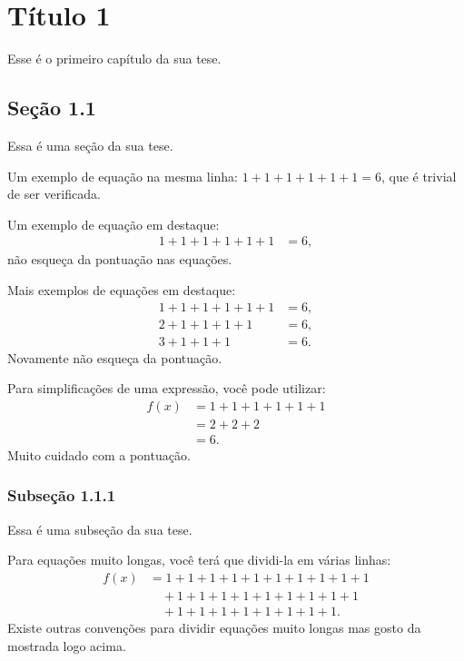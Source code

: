 \chapter{T\'itulo 1}
Esse \'e o primeiro cap\'itulo da sua tese.

\section{Se\c c\~ao 1.1}
Essa \'{e} uma se\c{c}\~{a}o da sua tese.

Um exemplo de equa\c{c}\~{a}o na mesma linha: 
$ 1 + 1 + 1 + 1 + 1 + 1 = 6$, 
que \'{e} trivial de ser verificada.

Um exemplo de equa\c{c}\~{a}o em destaque:
\begin{align*}
1 + 1 + 1 + 1 + 1 + 1 &= 6,
\end{align*}
n\~{a}o esque\c{c}a da pontua\c{c}\~{a}o nas equa\c{c}\~{o}es.

Mais exemplos de equa\c{c}\~{o}es em destaque:
\begin{align*}
1 + 1 + 1 + 1 + 1 + 1 &= 6, \\
2 + 1 + 1 + 1 + 1 &= 6, \\
3 + 1 + 1 + 1 &= 6.
\end{align*}
Novamente n\~{a}o esque\c{c}a da pontua\c{c}\~{a}o.

Para simplifica\c{c}\~{o}es de uma express\~{a}o, voc\^{e} pode utilizar:
\begin{align*}
    f(x) &= 1 + 1 + 1 + 1 + 1 + 1 \\
    &= 2 + 2 + 2 \\
    &= 6.
\end{align*}
Muito cuidado com a pontua\c{c}\~{a}o.

\subsection{Subse\c{c}\~ao 1.1.1}
Essa \'{e} uma subse\c{c}\~{a}o da sua tese.

Para equa\c{c}\~{o}es muito longas, voc\^{e} terá que dividi-la em várias linhas:
\begin{align*}
    f(x) &= 1 + 1 + 1 + 1 + 1 + 1 + 1 + 1 + 1 + 1 \\
    &\quad {}+ 1 + 1 + 1 + 1 + 1 + 1 + 1 + 1 + 1 \\
    &\quad {}+ 1 + 1 + 1 + 1 + 1 + 1 + 1 + 1.
\end{align*}
Existe outras conven\c{c}\~{o}es para dividir equa\c{c}\~{o}es muito longas mas gosto da
mostrada logo acima.

